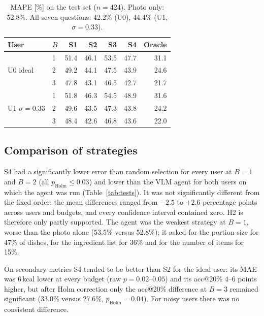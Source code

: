 \documentclass[twocolumn]{svjour3}
\begin{document}
\begin{table}[t]
  \centering
  \caption{MAPE [\%] on the test set ($n=424$). Photo only: 52.8\%. All seven questions: 42.2\% (U0),
  44.4\% (U1, $\sigma=0.33$).}
  \label{tab:main}
  \setlength{\tabcolsep}{3.5pt}
  \begin{tabular}{@{}llrrrrr@{}}
    \toprule
    User & $B$ & S1 & S2 & S3 & S4 & Oracle \\
    \midrule
    \multirow{3}{*}{U0 ideal}           & 1 & 51.4 & 46.1 & 53.5 & 47.7 & 31.1 \\
                                        & 2 & 49.2 & 44.1 & 47.5 & 43.9 & 24.6 \\
                                        & 3 & 47.8 & 43.1 & 46.5 & 42.7 & 21.7 \\
    \midrule
    \multirow{3}{*}{U1 $\sigma{=}0.33$} & 1 & 51.8 & 46.3 & 54.5 & 48.9 & 31.6 \\
                                        & 2 & 49.6 & 43.5 & 47.3 & 43.8 & 24.2 \\
                                        & 3 & 48.4 & 42.6 & 46.8 & 43.6 & 22.0 \\
    \bottomrule
  \end{tabular}
\end{table}

\subsection{Comparison of strategies}
S4 had a significantly lower error than random selection for every user at $B=1$ and $B=2$ (all
$p_{\text{Holm}}\le 0.03$) and lower than the VLM agent for both users on which the agent was run
(Table~\ref{tab:tests}). It was not significantly different from the fixed order: the mean differences
ranged from $-2.5$ to $+2.6$ percentage points across users and budgets, and every confidence interval
contained zero. H2 is therefore only partly supported. The agent was the weakest strategy at $B=1$, worse
than the photo alone (53.5\% versus 52.8\%); it asked for the portion size for 47\% of dishes, for the
ingredient list for 36\% and for the number of items for 15\%.

On secondary metrics S4 tended to be better than S2 for the ideal user: its MAE was 6\,kcal lower at every
budget (raw $p=0.02$--$0.05$) and its acc@20\% 4--6 points higher, but after Holm correction only the
acc@20\% difference at $B=3$ remained significant (33.0\% versus 27.6\%, $p_{\text{Holm}}=0.04$). For noisy
users there was no consistent difference.
\end{document}
